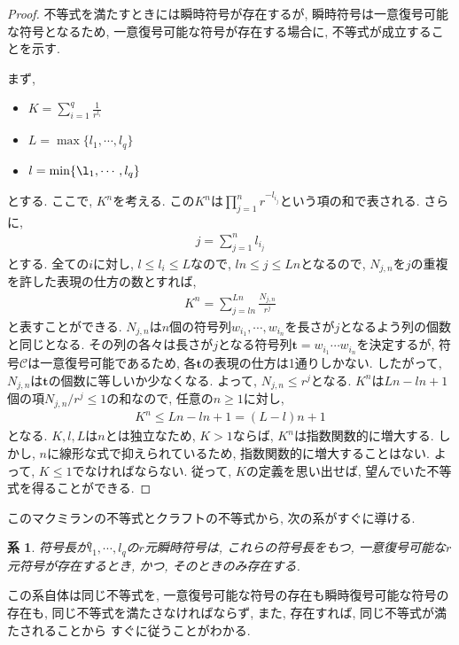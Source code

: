 \documentclass[12pt]{ltjsarticle}
\newtheorem{corollary}{系}
\begin{document}
\begin{proof}
  不等式を満たすときには瞬時符号が存在するが, 瞬時符号は一意復号可能な符号となるため,
  一意復号可能な符号が存在する場合に, 不等式が成立することを示す.

  まず,
  \begin{itemize}
    \item $\displaystyle K = \sum_{i = 1}^q \frac{1}{r^{l_i}}$
    \item $L = \max\{l_1, \cdots, l_q\}$
    \item $l = \min\{\l_1, \cdots, l_q\}$
  \end{itemize}
  とする.
  ここで, $K^n$を考える.
  この$K^n$は$\prod_{j = 1}^n r^{-l_{i_j}}$という項の和で表される.
  さらに,
  \begin{align*}
    j = \sum_{j = 1}^n l_{i_j}
  \end{align*}
  とする.
  全ての$i$に対し, $l \leq l_i \leq L$なので, $ln \leq j \leq Ln$となるので,
  $N_{j, n}$を$j$の重複を許した表現の仕方の数とすれば,
  \begin{align*}
    K^n = \sum_{j = l n}^{L n} \frac{N_{j, n}}{r^j}
  \end{align*}
  と表すことができる.
  $N_{j, n}$は$n$個の符号列$w_{i_1}, \cdots, w_{i_n}$を長さが$j$となるよう列の個数と同じとなる.
  その列の各々は長さが$j$となる符号列$\boldsymbol{t} = w_{i_1} \cdots w_{i_n}$を決定するが,
  符号$\mathcal{C}$は一意復号可能であるため, 各$\boldsymbol{t}$の表現の仕方は1通りしかない.
  したがって, $N_{j, n}$は$\boldsymbol{t}$の個数に等しいか少なくなる.
  よって, $N_{j, n} \leq r^j$となる.
  $K^n$は$Ln - ln + 1$個の項$N_{j, n} / r^j \leq 1$の和なので, 任意の$n \geq 1$に対し,
  \begin{align*}
    K^n \leq Ln - ln + 1 = (L - l) n + 1
  \end{align*}
  となる.
  $K, l, L$は$n$とは独立なため, $K > 1$ならば, $K^n$は指数関数的に増大する.
  しかし, $n$に線形な式で抑えられているため, 指数関数的に増大することはない.
  よって, $K \leq 1$でなければならない.
  従って, $K$の定義を思い出せば, 望んでいた不等式を得ることができる.
\end{proof}

このマクミランの不等式とクラフトの不等式から, 次の系がすぐに導ける.
\begin{screen}
  \begin{corollary}
    符号長が$l_1, \cdots, l_q$の$r$元瞬時符号は, これらの符号長をもつ,
    一意復号可能な$r$元符号が存在するとき, かつ, そのときのみ存在する.
  \end{corollary}
\end{screen}
この系自体は同じ不等式を, 一意復号可能な符号の存在も瞬時復号可能な符号の存在も,
同じ不等式を満たさなければならず, また, 存在すれば, 同じ不等式が満たされることから
すぐに従うことがわかる.

\printbibliography[title=参考文献]
\end{document}

